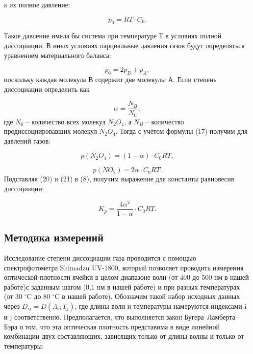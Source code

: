 \documentclass[a4paper,12pt]{article} %
\begin{document}
а их полное давление:

\begin{equation}
 p_0 = RT \cdot C_0.
\end{equation}

Такое давление имела бы система при температуре Т в условиях полной диссоциации. В иных условиях парциальные давления газов будут определяться уравнением материального баланса:

\begin{equation}
 p_0 = 2p_B + p_A,
\end{equation}
поскольку каждая молекула В содержит две молекулы А.
Если степень диссоциации определить как

\begin{equation}
 \alpha = \frac{N_B}{N_0},	
\end{equation}
где $N_0$ -- количество всех молекул $N_2 O_4$, а $N_B$ -- количество продиссоциировавших молекул $N_2 O_4$.
Тогда с учётом формулы (17) получим для давлений газов:

\begin{equation}
 p(N_2 O_4)  = (1 - \alpha) \cdot C_0 RT,
\end{equation}


\begin{equation}
p(N O_2)  = 2\alpha \cdot C_0 RT.
\end{equation}
Подставляя (20) и (21) в (8), получим выражение для константы равновесия диссоциации:

\begin{equation}
K_p = \frac{4 \alpha^2}{1- \alpha}\cdot C_0 RT.
\end{equation}



\subsection*{Методика измерений}

Исследование степени диссоциации газа проводится с помощью спектрофотометра Shimadzu UV-1800, который позволяет проводить измерения оптической плотности ячейки в целом диапазоне волн (от 400 до 500 нм в нашей работе)с заданным шагом (0,1 нм в нашей работе) и при разных температурах (от 30 $^\circ$C до 80 $^\circ$C в нашей работе). Обозначим такой набор исходных данных через \(D_{ij} = D(\Lambda_i;T_j)\), где длины волн и температуры намеруются индексами i и j соответственно. Предполагается, что выполняется закон Бугера--Ламберта--Бэра о том, что эта оптическая плотность представима в виде  линейной комбинации двух составляющих, зависящих только от длины волны и только от температуры:
\end{document}
